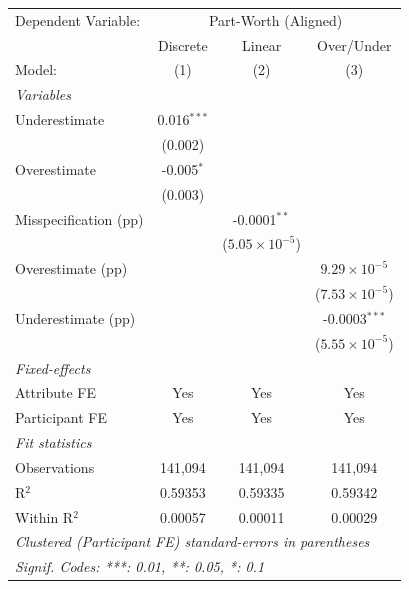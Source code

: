    \begin{tabular}{lccc}
      \tabularnewline \midrule \midrule
      Dependent Variable: & \multicolumn{3}{c}{Part-Worth (Aligned)}\\
                            & Discrete      & Linear                  & Over/Under \\   
      Model:                & (1)           & (2)                     & (3)\\  
      \midrule
      \emph{Variables}\\
      Underestimate         & 0.016$^{***}$ &                         &   \\   
                            & (0.002)       &                         &   \\   
      Overestimate          & -0.005$^{*}$  &                         &   \\   
                            & (0.003)       &                         &   \\   
      Misspecification (pp) &               & -0.0001$^{**}$          &   \\   
                            &               & ($5.05\times 10^{-5}$)  &   \\   
      Overestimate (pp)     &               &                         & $9.29\times 10^{-5}$\\    
                            &               &                         & ($7.53\times 10^{-5}$)\\    
      Underestimate (pp)    &               &                         & -0.0003$^{***}$\\   
                            &               &                         & ($5.55\times 10^{-5}$)\\    
      \midrule
      \emph{Fixed-effects}\\
      Attribute FE          & Yes           & Yes                     & Yes\\  
      Participant FE        & Yes           & Yes                     & Yes\\  
      \midrule
      \emph{Fit statistics}\\
      Observations          & 141,094       & 141,094                 & 141,094\\  
      R$^2$                 & 0.59353       & 0.59335                 & 0.59342\\  
      Within R$^2$          & 0.00057       & 0.00011                 & 0.00029\\  
      \midrule \midrule
      \multicolumn{4}{l}{\emph{Clustered (Participant FE) standard-errors in parentheses}}\\
      \multicolumn{4}{l}{\emph{Signif. Codes: ***: 0.01, **: 0.05, *: 0.1}}\\
   \end{tabular}
